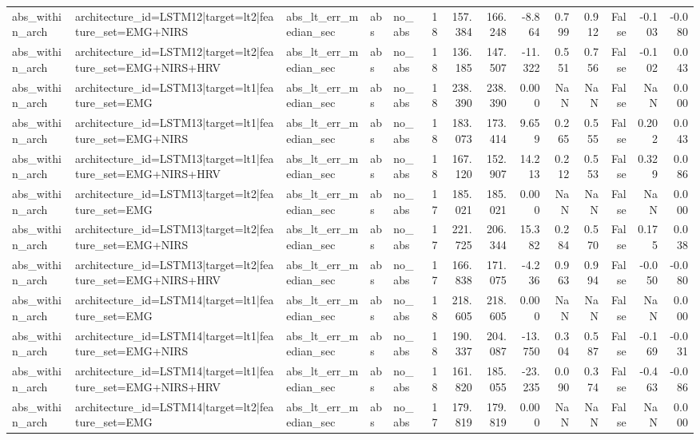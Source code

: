 \begin{table}
\begin{tabular}{lllllrrrrrrrrr}
abs_within_arch & architecture_id=LSTM12|target=lt2|feature_set=EMG+NIRS & abs_lt_err_median_sec & abs & no_abs & 18 & 157.384 & 166.248 & -8.864 & 0.799 & 0.912 & False & -0.103 & -0.080 \\
abs_within_arch & architecture_id=LSTM12|target=lt2|feature_set=EMG+NIRS+HRV & abs_lt_err_median_sec & abs & no_abs & 18 & 136.185 & 147.507 & -11.322 & 0.551 & 0.756 & False & -0.102 & 0.043 \\
abs_within_arch & architecture_id=LSTM13|target=lt1|feature_set=EMG & abs_lt_err_median_sec & abs & no_abs & 18 & 238.390 & 238.390 & 0.000 & NaN & NaN & False & NaN & 0.000 \\
abs_within_arch & architecture_id=LSTM13|target=lt1|feature_set=EMG+NIRS & abs_lt_err_median_sec & abs & no_abs & 18 & 183.073 & 173.414 & 9.659 & 0.265 & 0.555 & False & 0.202 & 0.043 \\
abs_within_arch & architecture_id=LSTM13|target=lt1|feature_set=EMG+NIRS+HRV & abs_lt_err_median_sec & abs & no_abs & 18 & 167.120 & 152.907 & 14.213 & 0.212 & 0.553 & False & 0.329 & 0.086 \\
abs_within_arch & architecture_id=LSTM13|target=lt2|feature_set=EMG & abs_lt_err_median_sec & abs & no_abs & 17 & 185.021 & 185.021 & 0.000 & NaN & NaN & False & NaN & 0.000 \\
abs_within_arch & architecture_id=LSTM13|target=lt2|feature_set=EMG+NIRS & abs_lt_err_median_sec & abs & no_abs & 17 & 221.725 & 206.344 & 15.382 & 0.284 & 0.570 & False & 0.175 & 0.038 \\
abs_within_arch & architecture_id=LSTM13|target=lt2|feature_set=EMG+NIRS+HRV & abs_lt_err_median_sec & abs & no_abs & 17 & 166.838 & 171.075 & -4.236 & 0.963 & 0.994 & False & -0.050 & -0.080 \\
abs_within_arch & architecture_id=LSTM14|target=lt1|feature_set=EMG & abs_lt_err_median_sec & abs & no_abs & 18 & 218.605 & 218.605 & 0.000 & NaN & NaN & False & NaN & 0.000 \\
abs_within_arch & architecture_id=LSTM14|target=lt1|feature_set=EMG+NIRS & abs_lt_err_median_sec & abs & no_abs & 18 & 190.337 & 204.087 & -13.750 & 0.304 & 0.587 & False & -0.169 & -0.031 \\
abs_within_arch & architecture_id=LSTM14|target=lt1|feature_set=EMG+NIRS+HRV & abs_lt_err_median_sec & abs & no_abs & 18 & 161.820 & 185.055 & -23.235 & 0.090 & 0.374 & False & -0.463 & -0.086 \\
abs_within_arch & architecture_id=LSTM14|target=lt2|feature_set=EMG & abs_lt_err_median_sec & abs & no_abs & 17 & 179.819 & 179.819 & 0.000 & NaN & NaN & False & NaN & 0.000 \\

\end{tabular}
\end{table}
